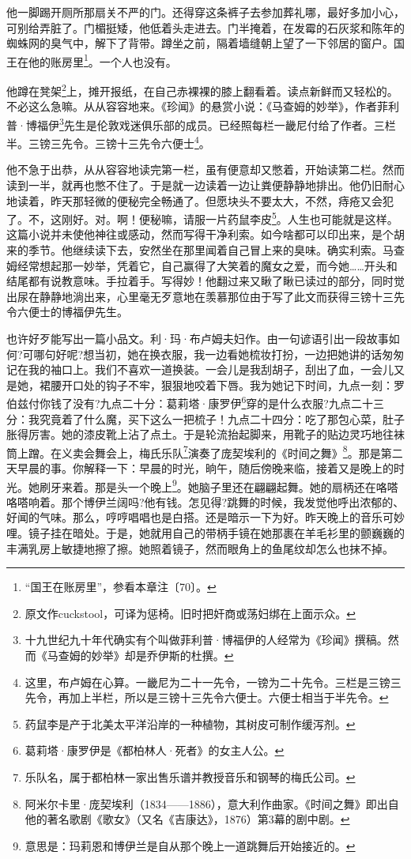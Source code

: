 \par 他一脚踢开厕所那扇关不严的门。还得穿这条裤子去参加葬礼哪，最好多加小心，可别给弄脏了。门楣挺矮，他低着头走进去。门半掩着，在发霉的石灰浆和陈年的蜘蛛网的臭气中，解下了背带。蹲坐之前，隔着墙缝朝上望了一下邻居的窗户。国王在他的账房里\footnote{“国王在账房里”，参看本章注〔70〕。}。一个人也没有。
\par 他蹲在凳架\footnote{原文作cuckstool，可译为惩椅。旧时把奸商或荡妇绑在上面示众。}上，摊开报纸，在自己赤裸裸的膝上翻看着。读点新鲜而又轻松的。不必这么急嘛。从从容容地来。《珍闻》的悬赏小说：《马查姆的妙举》，作者菲利普·博福伊\footnote{十九世纪九十年代确实有个叫做菲利普·博福伊的人经常为《珍闻》撰稿。然而《马查姆的妙举》却是乔伊斯的杜撰。}先生是伦敦戏迷俱乐部的成员。已经照每栏一畿尼付给了作者。三栏半。三镑三先令。三镑十三先令六便士\footnote{这里，布卢姆在心算。一畿尼为二十一先令，一镑为二十先令。三栏是三镑三先令，再加上半栏，所以是三镑十三先令六便士。六便士相当于半先令。}。
\par 他不急于出恭，从从容容地读完第一栏，虽有便意却又憋着，开始读第二栏。然而读到一半，就再也憋不住了。于是就一边读着一边让粪便静静地排出。他仍旧耐心地读着，昨天那轻微的便秘完全畅通了。但愿块头不要太大，不然，痔疮又会犯了。不，这刚好。对。啊！便秘嘛，请服一片药鼠李皮\footnote{药鼠李是产于北美太平洋沿岸的一种植物，其树皮可制作缓泻剂。}。人生也可能就是这样。这篇小说并未使他神往或感动，然而写得干净利索。如今啥都可以印出来，是个胡来的季节。他继续读下去，安然坐在那里闻着自己冒上来的臭味。确实利索。马查姆经常想起那一妙举，凭着它，自己赢得了大笑着的魔女之爱，而今她……开头和结尾都有说教意味。手拉着手。写得妙！他翻过来又瞅了瞅已读过的部分，同时觉出尿在静静地淌出来，心里毫无歹意地在羡慕那位由于写了此文而获得三镑十三先令六便士的博福伊先生。
\par 也许好歹能写出一篇小品文。利·玛·布卢姆夫妇作。由一句谚语引出一段故事如何?可哪句好呢?想当初，她在换衣服，我一边看她梳妆打扮，一边把她讲的话匆匆记在我的袖口上。我们不喜欢一道换装。一会儿是我刮胡子，刮出了血，一会儿又是她，裙腰开口处的钩子不牢，狠狠地咬着下唇。我为她记下时间，九点一刻：罗伯兹付你钱了没有?九点二十分：葛莉塔·康罗伊\footnote{葛莉塔·康罗伊是《都柏林人·死者》的女主人公。}穿的是什么衣服?九点二十三分：我究竟着了什么魔，买下这么一把梳子！九点二十四分：吃了那包心菜，肚子胀得厉害。她的漆皮靴上沾了点土。于是轮流抬起脚来，用靴子的贴边灵巧地往袜筒上蹭。在义卖会舞会上，梅氏乐队\footnote{乐队名，属于都柏林一家出售乐谱并教授音乐和钢琴的梅氏公司。}演奏了庞契埃利的《时间之舞》\footnote{阿米尔卡里·庞契埃利（1834——1886），意大利作曲家。《时间之舞》即出自他的著名歌剧《歌女》（又名《吉康达》，1876）第3幕的剧中剧。}。那是第二天早晨的事。你解释一下：早晨的时光，晌午，随后傍晚来临，接着又是晚上的时光。她刷牙来着。那是头一个晚上\footnote{意思是：玛莉恩和博伊兰是自从那个晚上一道跳舞后开始接近的。}。她脑子里还在翩翩起舞。她的扇柄还在咯嗒咯嗒响着。那个博伊兰阔吗?他有钱。怎见得?跳舞的时候，我发觉他呼出浓郁的、好闻的气味。那么，哼哼唱唱也是白搭。还是暗示一下为好。昨天晚上的音乐可妙哩。镜子挂在暗处。于是，她就用自己的带柄手镜在她那裹在羊毛衫里的颤巍巍的丰满乳房上敏捷地擦了擦。她照着镜子，然而眼角上的鱼尾纹却怎么也抹不掉。
